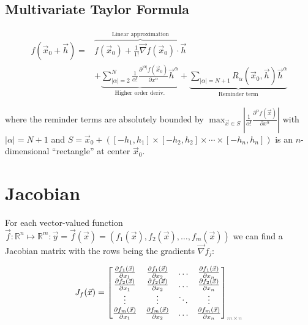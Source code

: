 \subsection{Multivariate Taylor Formula}

\begin{align*}
    f(\vec{x}_0 + \vec{h}) = &
    \overbrace{f(\vec{x}_0) + \frac{1}{1!}\vec\nabla f(\vec{x}_0)\cdot \vec{h}}^{\text{Linear approximation}} \\
    & + \underbrace{\sum_{|\alpha|=2}^N\frac{1}{\alpha!}\frac{\partial^{|\alpha|}f(\vec{x}_0)}{\partial x^\alpha}\vec{h}^\alpha}_{\text{Higher order deriv.}}
    + \underbrace{\sum_{|\alpha|=N+1}R_\alpha(\vec{x}_0,\vec{h})\vec{h}^\alpha}_{\text{Reminder term}}
\end{align*}

where the reminder terms are absolutely bounded by
$\displaystyle\max_{\vec{x}\in S}\left| \frac{1}{\alpha!}\frac{\partial^\alpha f(\vec{x})}{\partial x^\alpha} \right|$
with $|\alpha|=N+1$ and
$S={\vec{x}}_{0}+\left(\left[-h_{1},h_{1}\right]\times\left[-h_{2},h_{2}\right]\times\cdots\times\left[-h_{n},h_{n}\right]\right)$
is an $n$-dimensional ``rectangle'' at center $\vec{x}_0$.


\section{Jacobian}

For each vector-valued function
$\vec{f} : \mathbb{R}^n \mapsto \mathbb{R}^m : \vec{y} = \vec{f}(\vec{x}) = \left(f_1(\vec{x}),f_2(\vec{x}),\ldots,f_m(\vec{x})\right)$
we can find a Jacobian matrix with the rows being the gradients $\vec{\nabla}f_j$:
\begin{snugshade*}
    \begin{align*}
        J_f(\vec{x}) = \begin{bmatrix}
                           \frac{\partial f_1(\vec{x})}{\partial x_1} &
                           \frac{\partial f_1(\vec{x})}{\partial x_2} &
                           \ldots &
                           \frac{\partial f_1(\vec{x})}{\partial x_n} \\
                           \frac{\partial f_2(\vec{x})}{\partial x_1} &
                           \frac{\partial f_2(\vec{x})}{\partial x_2} &
                           \ldots &
                           \frac{\partial f_2(\vec{x})}{\partial x_n} \\
                           \vdots & \vdots & \ddots & \vdots \\
                           \frac{\partial f_m(\vec{x})}{\partial x_1} &
                           \frac{\partial f_m(\vec{x})}{\partial x_2} &
                           \ldots &
                           \frac{\partial f_m(\vec{x})}{\partial x_n}
        \end{bmatrix}_{\color{gray}m\times n}
    \end{align*}
\end{snugshade*}


